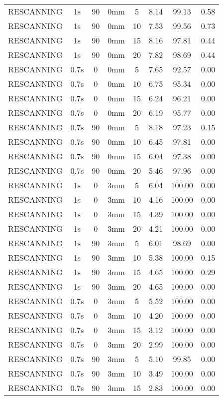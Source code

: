 \begin{table}[H]
\begin{tabular}{|c||c|c|c|c||c|c|c|}
RESCANNING & 1s & 90 & 0mm & 5 & 8.14 & 99.13 & 0.58 \\
RESCANNING & 1s & 90 & 0mm & 10 & 7.53 & 99.56 & 0.73 \\
RESCANNING & 1s & 90 & 0mm & 15 & 8.16 & 97.81 & 0.44 \\
RESCANNING & 1s & 90 & 0mm & 20 & 7.82 & 98.69 & 0.44 \\
RESCANNING & 0.7s & 0 & 0mm & 5 & 7.65 & 92.57 & 0.00 \\
RESCANNING & 0.7s & 0 & 0mm & 10 & 6.75 & 95.34 & 0.00 \\
RESCANNING & 0.7s & 0 & 0mm & 15 & 6.24 & 96.21 & 0.00 \\
RESCANNING & 0.7s & 0 & 0mm & 20 & 6.19 & 95.77 & 0.00 \\
RESCANNING & 0.7s & 90 & 0mm & 5 & 8.18 & 97.23 & 0.15 \\
RESCANNING & 0.7s & 90 & 0mm & 10 & 6.45 & 97.81 & 0.00 \\
RESCANNING & 0.7s & 90 & 0mm & 15 & 6.04 & 97.38 & 0.00 \\
RESCANNING & 0.7s & 90 & 0mm & 20 & 5.46 & 97.96 & 0.00 \\
RESCANNING & 1s & 0 & 3mm & 5 & 6.04 & 100.00 & 0.00 \\
RESCANNING & 1s & 0 & 3mm & 10 & 4.16 & 100.00 & 0.00 \\
RESCANNING & 1s & 0 & 3mm & 15 & 4.39 & 100.00 & 0.00 \\
RESCANNING & 1s & 0 & 3mm & 20 & 4.21 & 100.00 & 0.00 \\
RESCANNING & 1s & 90 & 3mm & 5 & 6.01 & 98.69 & 0.00 \\
RESCANNING & 1s & 90 & 3mm & 10 & 5.38 & 100.00 & 0.15 \\
RESCANNING & 1s & 90 & 3mm & 15 & 4.65 & 100.00 & 0.29 \\
RESCANNING & 1s & 90 & 3mm & 20 & 4.65 & 100.00 & 0.00 \\
RESCANNING & 0.7s & 0 & 3mm & 5 & 5.52 & 100.00 & 0.00 \\
RESCANNING & 0.7s & 0 & 3mm & 10 & 4.20 & 100.00 & 0.00 \\
RESCANNING & 0.7s & 0 & 3mm & 15 & 3.12 & 100.00 & 0.00 \\
RESCANNING & 0.7s & 0 & 3mm & 20 & 2.99 & 100.00 & 0.00 \\
RESCANNING & 0.7s & 90 & 3mm & 5 & 5.10 & 99.85 & 0.00 \\
RESCANNING & 0.7s & 90 & 3mm & 10 & 3.49 & 100.00 & 0.00 \\
RESCANNING & 0.7s & 90 & 3mm & 15 & 2.83 & 100.00 & 0.00 \\

\end{tabular}
\end{table}
